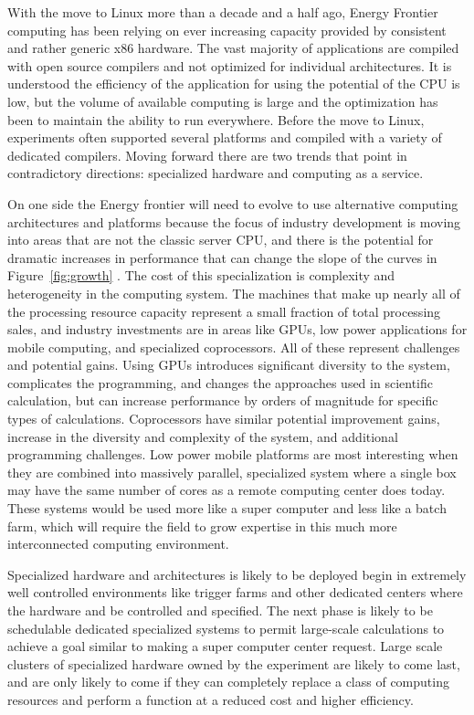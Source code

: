 With the move to Linux more than a decade and a half ago, Energy
Frontier computing has been relying on ever increasing capacity
provided by consistent and rather generic x86 hardware.  The vast
majority of applications are compiled with open source compilers and
not optimized for individual architectures.  It is understood the
efficiency of the application for using the potential of the CPU is
low, but the volume of available computing is large and the
optimization has been to maintain the ability to run everywhere.
Before the move to Linux, experiments often supported several
platforms and compiled with a variety of dedicated compilers.  Moving
forward there are two trends that point in contradictory directions:
specialized hardware and computing as a service.

On one side the Energy frontier will need to evolve to use alternative
computing architectures and platforms because the focus of industry
development is moving into areas that are not the classic server CPU,
and there is the potential for dramatic increases in performance that
can change the slope of the curves in Figure~\ref{fig:growth} .  The
cost of this specialization is complexity and heterogeneity in the
computing system.  The machines that make up nearly all of the
processing resource capacity represent a small fraction of total
processing sales, and industry investments are in areas like GPUs, low
power applications for mobile computing, and specialized coprocessors.
All of these represent challenges and potential gains.  Using GPUs
introduces significant diversity to the system, complicates the
programming, and changes the approaches used in scientific
calculation, but can increase performance by orders of magnitude for
specific types of calculations.  Coprocessors have similar potential
improvement gains, increase in the diversity and complexity of the
system, and additional programming challenges.  Low power mobile
platforms are most interesting when they are combined into massively
parallel, specialized system where a single box may have the same
number of cores as a remote computing center does today.  These
systems would be used more like a super computer and less like a batch
farm, which will require the field to grow expertise in this much more
interconnected computing environment.


Specialized hardware and architectures is likely to be deployed begin
in extremely well controlled environments like trigger farms and other
dedicated centers where the hardware and be controlled and specified.
The next phase is likely to be schedulable dedicated specialized
systems to permit large-scale calculations to achieve a goal similar
to making a super computer center request.  Large scale clusters of
specialized hardware owned by the experiment are likely to come last,
and are only likely to come if they can completely replace a class of
computing resources and perform a function at a reduced cost and
higher efficiency.

